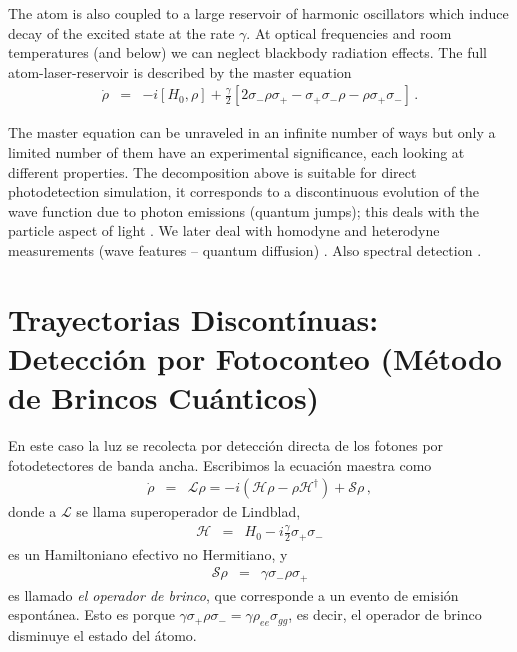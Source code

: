 \documentclass[twocolumn,aps,eqsecnum,showkeys,amsmath]{revtex4}
\newcommand{\mcH}{\mathcal{H}} 	%
\newcommand{\mcL}{\mathcal{L}}
\newcommand{\mcS}{\mathcal{S}}
\begin{document}
The atom is also coupled to a large reservoir of harmonic oscillators 
which induce decay of the excited state at the rate $\gamma$. At optical 
frequencies and room temperatures (and below)  we can neglect 
blackbody radiation effects. The full atom-laser-reservoir is described by 
the master equation 
%
\begin{eqnarray} 	\label{MasterEq}
\dot{\rho} &=& - i [H_0,\rho] +\frac{\gamma}{2} \left[ 2 \sigma_- \rho \sigma_+ 
	-\sigma_+ \sigma_- \rho - \rho  \sigma_+ \sigma_- \right]  	\,. 		
\end{eqnarray}

The master equation can be unraveled in an infinite number of ways but 
only a limited number of them have an experimental significance, each 
looking at different properties. The decomposition above is suitable for 
direct photodetection simulation, it corresponds to a discontinuous 
evolution of the wave function due to photon emissions (quantum jumps); 
this deals with the particle aspect of light  \cite{Carm93,DaCM92,DuZR92}. 
We later deal with homodyne and heterodyne measurements (wave 
features -- quantum diffusion) 
\cite{Carm93,Carm96,WiMi93a,WiMi93b,Perc98}. Also spectral detection \cite{TiCa92,Holl97}. 


\section{Trayectorias Discont\'inuas: Detecci\'on por Fotoconteo 
(M\'etodo de Brincos Cu\'anticos)}
En este caso la luz se recolecta por detecci\'on directa de los fotones por 
fotodetectores de banda ancha. Escribimos la ecuaci\'on maestra como 
%
\begin{eqnarray} 	\label{MasterEqEffJ}
\dot{\rho} &=& \mcL \rho = - i ( \mcH \rho -\rho \mcH^{\dag} )  +\mcS \rho \,, 
\end{eqnarray}
donde a $\mcL$ se llama superoperador de Lindblad, 
%
\begin{eqnarray} 
\mcH &=& H_0 - i \frac{\gamma}{2} \sigma_+ \sigma_-   
\end{eqnarray}
es un Hamiltoniano efectivo no Hermitiano, y  
%
\begin{eqnarray} 
\mcS \rho &=& \gamma \sigma_- \rho \sigma_+ 
\end{eqnarray}
es llamado \textit{el operador de brinco}, que corresponde a un evento de 
emisi\'on espont\'anea. Esto es porque  
$\gamma \sigma _+ \rho \sigma_ - = \gamma \rho_{ee} \sigma_{gg}$, es decir,  
el operador de brinco disminuye el estado del \'atomo. 
\end{document}
